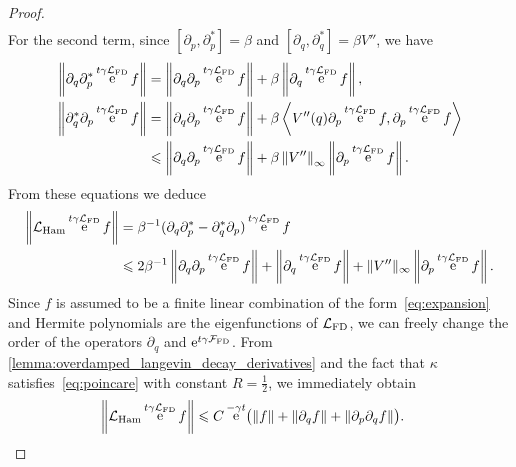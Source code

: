 \documentclass[11pt,a4paper]{article}
\DeclareMathOperator{\e}{e}
\newcommand{\commut}[2]{[#1, #2]}
\theoremstyle{plain}
\numberwithin{equation}{section}
\renewcommand{\leq}{\leqslant}
\begin{document}
\begin{proof}
\begin{align}
    \end{align}
    For the second term, since $\commut{\partial_p}{\partial_p^*} = \beta$ and $\commut{\partial_q}{\partial_q^*} = \beta V''$,
    we have
    \begin{align*}
        \norm{\partial_q \partial_p^* \e^{t \gamma \mathcal L_{\rm FD}} f}
        &= \norm{\partial_q \partial_p \e^{t \gamma \mathcal L_{\rm FD}} f} + \beta \norm{\partial_q \e^{t \gamma \mathcal L_{\rm FD}} f}, \\
        \norm{\partial_q^* \partial_p \e^{t \gamma \mathcal L_{\rm FD}} f}
        &= \norm{\partial_q \partial_p \e^{t \gamma \mathcal L_{\rm FD}} f}
        + \beta \ip{V''(q) \partial_p \e^{t \gamma \mathcal L_{\rm FD}} f}{\partial_p \e^{t \gamma \mathcal L_{\rm FD}} f} \\
        &\leq \norm{\partial_q \partial_p \e^{t \gamma \mathcal L_{\rm FD}} f}
        + \beta \norm{V''}[\infty] \norm{\partial_p \e^{t \gamma \mathcal L_{\rm FD}} f}.
    \end{align*}
    From these equations we deduce
    \begin{align}
        \notag
        \norm{\mathcal L_{\rm Ham} \e^{t \gamma \mathcal L_{\rm FD}} f}
        &= \beta^{-1} (\partial_q \partial_p^* - \partial_q^* \partial_p) \e^{t \gamma \mathcal L_{\rm FD}} f \\
        \label{eq:reasoning_action_lham}
        &\leq 2 \beta^{-1} \norm{\partial_q \partial_p \e^{t \gamma \mathcal L_{\rm FD}} f}
        + \norm{\partial_q \e^{t \gamma \mathcal L_{\rm FD}} f}
        + \norm*{V''}[\infty] \norm{\partial_p \e^{t \gamma \mathcal L_{\rm FD}} f}.
    \end{align}
    Since $f$ is assumed to be a finite linear combination of the form~\eqref{eq:expansion} and
    Hermite polynomials are the eigenfunctions of $\mathcal L_{\rm FD}$,
    we can freely change the order of the operators $\partial_q$ and $\e^{t \gamma \mathcal F_{\rm FD}}$. 
    From \cref{lemma:overdamped_langevin_decay_derivatives} and the fact that $\kappa$ satisfies~\eqref{eq:poincare} with constant $R = \frac{1}{2}$,
    we immediately obtain
    \begin{align*}
        \norm{\mathcal L_{\rm Ham} \e^{t \gamma \mathcal L_{\rm FD}} f}
        &\leq C \e^{-\gamma t} \bigl( \norm{f} + \norm{\partial_q f} + \norm{\partial_p \partial_q f}\bigr).

\end{align*}
\end{proof}
\end{document}
